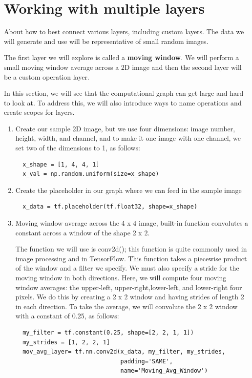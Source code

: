 \documentclass[twoside]{article}
\begin{document}
\section{Working with multiple layers}
About how to best connect various layers, including custom layers. The data we will generate and use will be representative of small random images.

The first layer we will explore is called a \textbf{moving window}. We will perform a small moving window average across a 2D image and then the second layer will be a custom operation layer.

In this section, we will see that the computational graph can get large and hard to look at. To address this, we will also introduce ways to name operations and create scopes for layers.


\begin{enumerate}
  \item Create our sample 2D image, but we use four dimensions: image number, height, width, and channel, and to make it one image with one channel, we set two of the dimensions to 1, as follows:
  \begin{lstlisting}
  x_shape = [1, 4, 4, 1]
  x_val = np.random.uniform(size=x_shape)
  \end{lstlisting}

  \item Create the placeholder in our graph where we can feed in the sample image
  \begin{lstlisting}
  x_data = tf.placeholder(tf.float32, shape=x_shape)
  \end{lstlisting}

  \item Moving window average across the 4 x 4 image, built-in function convolutes a constant across a window of the shape 2 x 2.

  The function we will use is conv2d(); this function is quite commonly used in image processing and in TensorFlow. This function takes a piecewise product of the window and a filter we specify. We must also specify a stride for the moving window in both directions. Here, we will compute four moving window averages: the upper-left, upper-right,lower-left, and lower-right four pixels. We do this by creating a 2 x 2 window and having strides of length 2 in each direction. To take the average, we will convolute the 2 x 2 window with a constant of 0.25, as follows:
  \begin{lstlisting}
  my_filter = tf.constant(0.25, shape=[2, 2, 1, 1])
  my_strides = [1, 2, 2, 1]
  mov_avg_layer= tf.nn.conv2d(x_data, my_filter, my_strides,
                              padding='SAME',
                              name='Moving_Avg_Window')
  \end{lstlisting}


\end{enumerate}
\end{document}
